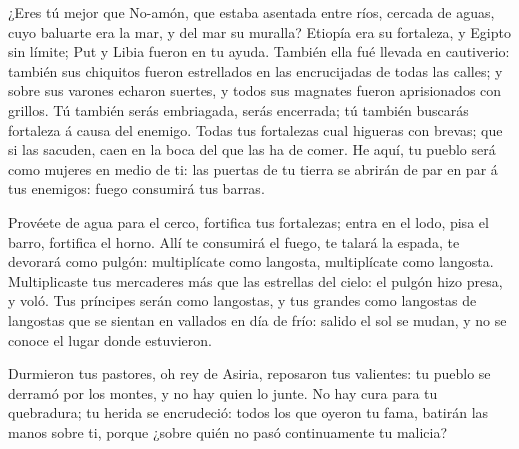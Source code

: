  ¿Eres tú mejor que No-amón, que estaba asentada entre ríos,
cercada de aguas, cuyo baluarte era la mar, y del mar su muralla?
 Etiopía era su fortaleza, y Egipto sin límite; Put y Libia
fueron en tu ayuda.  También ella fué llevada en
cautiverio: también sus chiquitos fueron estrellados en las encrucijadas
de todas las calles; y sobre sus varones echaron suertes, y todos sus
magnates fueron aprisionados con grillos.  Tú también serás
embriagada, serás encerrada; tú también buscarás fortaleza á causa del
enemigo.  Todas tus fortalezas cual higueras con brevas;
que si las sacuden, caen en la boca del que las ha de comer.
 He aquí, tu pueblo será como mujeres en medio de ti: las
puertas de tu tierra se abrirán de par en par á tus enemigos: fuego
consumirá tus barras.

 Provéete de agua para el cerco, fortifica tus fortalezas;
entra en el lodo, pisa el barro, fortifica el horno.  Allí
te consumirá el fuego, te talará la espada, te devorará como pulgón:
multiplícate como langosta, multiplícate como langosta. 
Multiplicaste tus mercaderes más que las estrellas del cielo: el pulgón
hizo presa, y voló.  Tus príncipes serán como langostas, y
tus grandes como langostas de langostas que se sientan en vallados en
día de frío: salido el sol se mudan, y no se conoce el lugar donde
estuvieron.

 Durmieron tus pastores, oh rey de Asiria, reposaron tus
valientes: tu pueblo se derramó por los montes, y no hay quien lo junte.
 No hay cura para tu quebradura; tu herida se encrudeció:
todos los que oyeron tu fama, batirán las manos sobre ti, porque ¿sobre
quién no pasó continuamente tu malicia?
